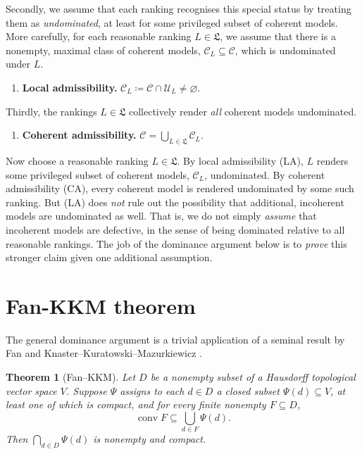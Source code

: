 \documentclass[11pt]{article}
\newtheorem{theorem}{Theorem}[section]
\theoremstyle{definition}
\theoremstyle{remark}
\newcommand{\C}{\mathcal C}
\newcommand{\U}{\mathcal U}
\begin{document}
Secondly, we assume that each ranking recognises this special status by treating them as \textit{undominated}, at least for some privileged subset of coherent models. More carefully, for each reasonable ranking $L\in\mathfrak L$,  we assume that there is a nonempty, maximal class of coherent models, $\C_L\subseteq\C$, which is undominated under $L$.
\begin{enumerate}[label=\textbf{(LA)},leftmargin=*]
\item \textbf{Local admissibility.} $\C_L\coloneqq \C\cap\U_L\neq\varnothing$.
\end{enumerate}

Thirdly, the rankings $L\in\mathfrak L$ collectively render \textit{all} coherent models undominated.
\begin{enumerate}[label=\textbf{(CA)},leftmargin=*]
\item \textbf{Coherent admissibility.} $\C=\bigcup_{L\in\mathfrak L}\C_L$.
\end{enumerate}

Now choose a reasonable ranking $L\in\mathfrak L$. By local admissibility (LA), $L$ renders some privileged subset of coherent models, $\C_L$, undominated. By coherent admissibility (CA), every coherent model is rendered undominated by some such ranking. But (LA) does \textit{not} rule out the possibility that additional, incoherent models are undominated as well. That is, we do not simply \textit{assume} that incoherent models are defective, in the sense of being dominated relative to all reasonable rankings. The job of the dominance argument below is to \textit{prove} this stronger claim given one additional assumption.





\section{Fan-KKM theorem}\label{sec:kkm}

The general dominance argument is a trivial application of a seminal result by Fan and Knaster--Kuratowski--Mazurkiewicz \cite[Theorem~17.46]{AliprantisBorder2006}.








\begin{theorem}[Fan--KKM]\label{thm:fan-kkm}
Let $D$ be a nonempty subset of a Hausdorff topological vector space $V$. Suppose $\Psi$ assigns to each $d\in D$ a closed subset $\Psi(d)\subseteq V$, at least one of which is compact, and for every finite nonempty $F\subseteq D$,
\[
\operatorname{conv}F\subseteq\bigcup_{d\in F}\Psi(d).
\]
Then $\bigcap_{d\in D}\Psi(d)$ is nonempty and compact.
\end{theorem}
\end{document}
